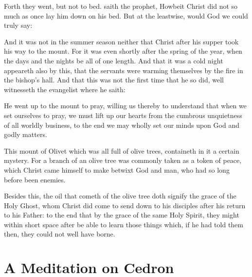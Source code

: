 \documentclass[a5paper]{scrbook}
\begin{document}
	\vspace{10mm}
	
	
	Forth they went, but not to bed.  saith the prophet,  Howbeit Christ did not so much as once lay him down on his bed. But at the leastwise, would God we could truly say: 
	
	And it was not in the summer season neither that Christ after his supper took his way to the mount. For it was even shortly after the spring of the year, when the days and the nights be all of one length. And that it was a cold night appeareth also by this, that the servants were warming themselves by the fire in the bishop's hall. And that this was not the first time that he so did, well witnesseth the evangelist where he saith: 
	
	He went up to the mount to pray, willing us thereby to understand that when we set ourselves to
	pray, we must lift up our hearts from the cumbrous unquietness of all worldly business, to the end we
	may wholly set our minds upon God and godly matters.
	
	This mount of Olivet which was all full of olive trees, containeth in it a certain mystery. For a
	branch of an olive tree was commonly taken as a token of peace, which Christ came himself to make betwixt God and man, who had so long before been enemies.
	
	Besides this, the oil that cometh of the olive tree doth signify the grace of the Holy Ghost, whom
	Christ did come to send down to his disciples after his return to his Father: to the end that by the grace
	of the same Holy Spirit, they might within short space after be able to learn those things which, if he had
	told them then, they could not well have borne.
	
	\chapter{A Meditation on Cedron}
	
\end{document}

